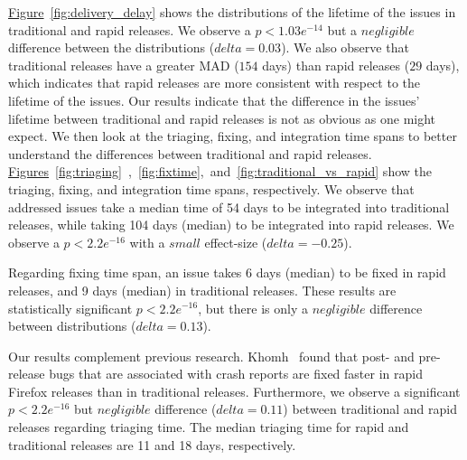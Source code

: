 \noindent\DIFdelbegin \textit{\textbf{}%
}%
\DIFdelend \DIFaddbegin {}
\DIFaddend \hyperref[fig:delivery_delay]{Figure}~\ref{fig:delivery_delay} shows the distributions of the lifetime of the
issues in traditional and rapid releases. We observe a $p<1.03e^{-14}$ but a
$negligible$ difference between the distributions ($\textit{delta}=0.03$). We
also observe that traditional releases have a greater MAD ($154$ days) than
rapid releases ($29$ days), which indicates that rapid releases are more
consistent with respect to the lifetime of the issues. Our results indicate that
the difference in the issues' lifetime between traditional and rapid releases is
not as obvious as one might expect. We then look at the triaging, fixing, and
integration time spans to better understand the differences between traditional
and rapid releases.\\

\noindent\DIFdelbegin \textit{\textbf{}%
}%
\DIFdelend \DIFaddbegin {}
\DIFaddend \hyperref[fig:triaging]{Figures}~\ref{fig:triaging}~,~\ref{fig:fixtime},~and~\ref{fig:traditional_vs_rapid}
show the triaging, fixing, and integration time spans, respectively. We observe
that addressed issues take a median time of 54 days to be integrated into
traditional releases, while taking 104 days (median) to be integrated into rapid
releases. We observe a $p<2.2e^{-16}$ with a $small$ effect-size ($delta=-0.25$).

Regarding fixing time span, an issue takes 6 days (median) to be fixed in
rapid releases, and 9 days (median) in traditional releases. These results
are statistically significant $p<2.2e^{-16}$, but there is only a $negligible$
difference between distributions ($delta=0.13$). 

Our results complement previous research. Khomh~\etal \cite{khomh2012faster}
found that post- and pre-release bugs that are associated with crash reports are
fixed faster in rapid Firefox releases than in traditional releases.
Furthermore, we observe a significant $p<2.2e^{-16}$ but $negligible$
difference ($\textit{delta}=0.11$) between traditional and rapid releases
regarding triaging time. The median triaging time for rapid and traditional
releases are 11 and 18 days, respectively.

